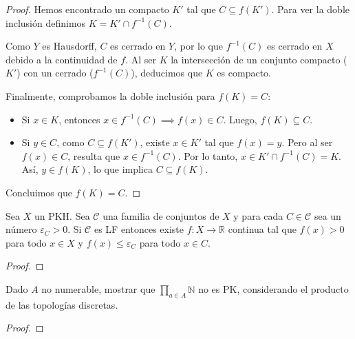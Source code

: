 \documentclass{article}
\theoremstyle{plain}
\theoremstyle{definition}
\newcommand{\N}{\mathbb{N}}
\newenvironment{ejercicio}[1]{\begin{trivlist}
\item[\hskip \labelsep {\bfseries Ejercicio}\hskip \labelsep {\bfseries #1.}]}{\end{trivlist}}
\begin{document}
\begin{proof}
    Hemos encontrado un compacto \( K' \) tal que \( C \subseteq f(K') \). Para ver la doble inclusión definimos \( K = K' \cap f^{-1}(C) \).

    Como \( Y \) es Hausdorff, \( C \) es cerrado en \( Y \), por lo que \( f^{-1}(C) \) es cerrado en \( X \) debido a la continuidad de \( f \). Al ser \( K \) la intersección de un conjunto compacto (\( K' \)) con un cerrado (\( f^{-1}(C) \)), deducimos que \( K \) es compacto.

    Finalmente, comprobamos la doble inclusión para \( f(K) = C \):
    \begin{itemize}
        \item Si \( x \in K \), entonces \( x \in f^{-1}(C) \implies f(x) \in C \). Luego, \( f(K) \subseteq C \).
        \item Si \( y \in C \), como \( C \subseteq f(K') \), existe \( x \in K' \) tal que \( f(x) = y \). Pero al ser \( f(x) \in C \), resulta que \( x \in f^{-1}(C) \). Por lo tanto, \( x \in K' \cap f^{-1}(C) = K \). Así, \( y \in f(K) \), lo que implica \( C \subseteq f(K) \).
    \end{itemize}
    Concluimos que \( f(K) = C \).
\end{proof}

\begin{ejercicio}{7}
    Sea \( X \) un PKH. Sea \( \mathcal{C} \) una familia de conjuntos de \( X \) y para cada \( C \in \mathcal{C} \) sea un número \( \varepsilon_{C} > 0 \). Si \( \mathcal{C} \) es LF entonces existe \( f:X \rightarrow \mathbb{R} \) continua tal que \( f(x) > 0 \) para todo \( x \in X \) y \( f(x) \le \varepsilon_{C} \) para todo \( x \in C \).
\end{ejercicio}
\begin{proof}

\end{proof}

\begin{ejercicio}{8}
    Dado \( A \) no numerable, mostrar que \( \prod_{a \in A} \N \) no es PK, considerando el producto de las topologías discretas.
\end{ejercicio}
\begin{proof}
    
\end{proof}
\end{document}
